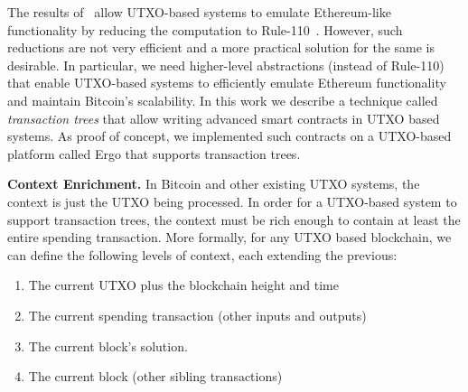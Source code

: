\documentclass[runningheads]{llncs}
\begin{document}

The results of~\cite{CKM18a} allow UTXO-based systems to emulate Ethereum-like functionality by reducing the computation to Rule-110~\cite{Cook_2009,neary2006p}. However, such reductions are not very efficient and a more practical solution for the same is desirable. 
In particular, we need higher-level abstractions (instead of Rule-110) that enable UTXO-based systems to efficiently emulate Ethereum functionality and maintain Bitcoin's scalability. 
In this work we describe a technique called {\em transaction trees} that allow writing advanced smart contracts in UTXO based systems. As proof of concept, we implemented such contracts on a UTXO-based platform called Ergo that supports transaction trees.

\textbf{Context Enrichment.} In Bitcoin and other existing UTXO systems, the context is just the UTXO being processed. In order for a UTXO-based system to support transaction trees, the context must be rich enough to contain at least the entire spending transaction. More formally, 
for any UTXO based blockchain, we can define the following levels of context, each extending the previous:
\begin{enumerate}
	\item The current UTXO plus the blockchain height and time
	\item The current spending transaction (other inputs and outputs)
	\item The current block's solution.
	\item The current block (other sibling transactions)
\end{enumerate}
\end{document}
